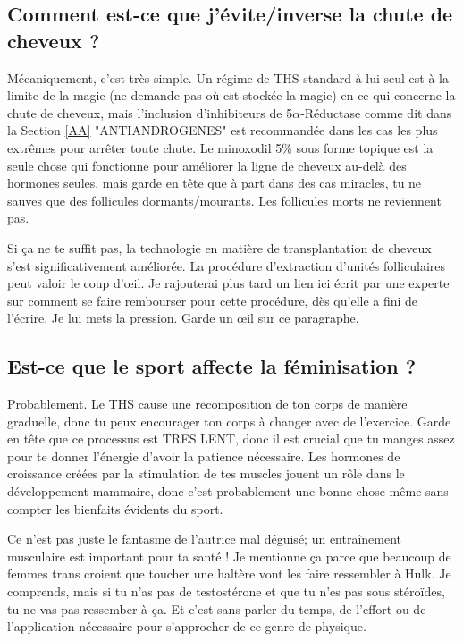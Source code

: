 \documentclass{article}
\begin{document}
\subsection{Comment est-ce que j'évite/inverse la chute de cheveux ?}\label{11-14}

Mécaniquement, c'est très simple. Un régime de THS standard à lui seul est à la limite de la magie (ne demande pas où est stockée la magie) en ce qui concerne la chute de cheveux, mais l'inclusion d'inhibiteurs de 5$\alpha$-Réductase comme dit dans la Section \ref{AA} "ANTIANDROGENES" est recommandée dans les cas les plus extrêmes pour arrêter toute chute. Le minoxodil 5\% sous forme topique est la seule chose qui fonctionne pour améliorer la ligne de cheveux au-delà des hormones seules, mais garde en tête que à part dans des cas miracles, tu ne sauves que des follicules dormants/mourants. Les follicules morts ne reviennent pas.   

Si ça ne te suffit pas, la technologie en matière de transplantation de cheveux s'est significativement améliorée. La procédure d'extraction d'unités folliculaires peut valoir le coup d'œil. Je rajouterai plus tard un lien ici écrit par une experte sur comment se faire rembourser pour cette procédure, dès qu'elle a fini de l'écrire. Je lui mets la pression. Garde un œil sur ce paragraphe. 

\subsection{Est-ce que le sport affecte la féminisation ?}

Probablement. Le THS cause une recomposition de ton corps de manière graduelle, donc tu peux encourager ton corps à changer avec de l'exercice. Garde en tête que ce processus est TRES LENT, donc il est crucial que tu manges assez pour te donner l'énergie d'avoir la patience nécessaire. Les hormones de croissance créées par la stimulation de tes muscles jouent un rôle dans le développement mammaire, donc c'est probablement une bonne chose même sans compter les bienfaits évidents du sport.

Ce n'est pas juste le fantasme de l'autrice mal déguisé; un entraînement musculaire est important pour ta santé ! Je mentionne ça parce que beaucoup de femmes trans croient que toucher une haltère vont les faire ressembler à Hulk. Je comprends, mais si tu n'as pas de testostérone et que tu n'es pas sous stéroïdes, tu ne vas pas ressember à ça. Et c'est sans parler du temps, de l'effort ou de l'application nécessaire pour s'approcher de ce genre de physique.
\end{document}
